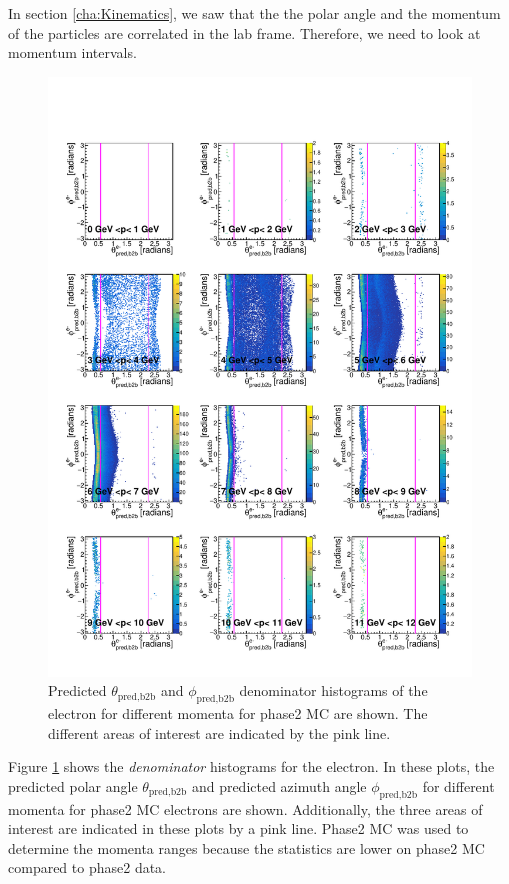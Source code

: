 \documentclass[a4paper,11pt,twosided,final,german,openbib,pdftex,listof=totoc,bibliography=totoc]{scrbook}
\begin{document}
In section \ref{cha:Kinematics}, we saw that the the polar angle and the momentum of the particles are correlated in the lab frame. Therefore, we need to look at momentum intervals. 

\begin{figure}[h!]
	\includegraphics[width=\textwidth]{Plots/master/RTPMemD_MC.pdf}
	\caption[Denominator $\theta_{\textrm{pred,b2b}}$-$\phi_{\textrm{pred,b2b}}$ Electron Momentum MC]{Predicted $\theta_{\textrm{pred,b2b}}$ and $\phi_{\textrm{pred,b2b}}$ denominator histograms of the electron for different momenta for phase2 MC are shown. The different areas of interest are indicated by the pink line.}
	\label{plt:RTPMemD_MC}
\end{figure}

Figure \ref{plt:RTPMemD_MC} shows the \textit{denominator} histograms for the electron. In these plots, the predicted polar angle $\theta_{\textrm{pred,b2b}}$ and predicted azimuth angle $\phi_{\textrm{pred,b2b}}$ for different momenta for phase2 MC electrons are shown. Additionally, the three areas of interest are indicated in these plots by a pink line. Phase2 MC was used to determine the momenta ranges because the statistics are lower on phase2 MC compared to phase2 data. 
\end{document}
